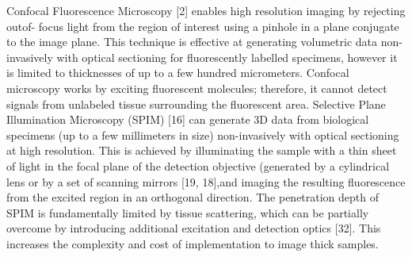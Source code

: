 Confocal Fluorescence Microscopy [2] enables high resolution imaging by rejecting outof- focus light from the region of interest using a pinhole in a plane conjugate to the image plane.
This technique is effective at generating volumetric data non-invasively with optical sectioning for fluorescently labelled specimens, however it is limited to thicknesses
of up to a few hundred micrometers.
Confocal microscopy works by exciting fluorescent molecules; therefore, it cannot detect signals from unlabeled tissue surrounding the fluorescent area.
Selective Plane Illumination Microscopy (SPIM) [16] can generate 3D data from biological specimens (up to a few millimeters in size) non-invasively with optical sectioning at
high resolution.
This is achieved by illuminating the sample with a thin sheet of light in the focal plane of the detection objective (generated by a cylindrical lens or by a set of scanning mirrors [19, 18],and imaging the resulting fluorescence from the excited region in an orthogonal direction.
The penetration depth of SPIM is fundamentally limited by tissue scattering, which can be partially overcome by introducing additional excitation and detection optics [32].
This increases the complexity and cost of implementation to image thick samples.


